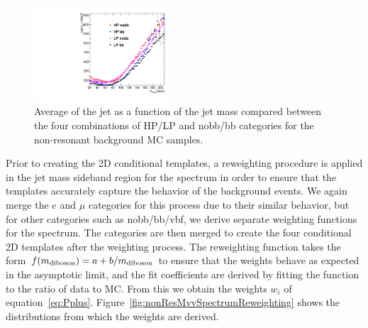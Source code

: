 \begin{figure}[htbp]
  \centering
  \includegraphics[width=0.45\textwidth]{fig/analysis/nonRes_corr.pdf}
  \caption{
    Average \pt of the jet as a function of the jet mass \MJ compared between the four combinations of HP/LP and nobb/bb categories for the non-resonant background MC samples.
  }
  \label{fig:nonRes2DCorr}
\end{figure}

Prior to creating the 2D conditional templates, a reweighting procedure is applied in the jet mass sideband region for the \MVV spectrum in order to ensure that the templates accurately capture the behavior of the background events.
We again merge the $e$ and $\mu$ categories for this process due to their similar behavior, but for other categories such as nobb/bb/vbf, we derive separate weighting functions for the \MVV spectrum.
The categories are then merged to create the four conditional 2D templates after the weighting process.
The reweighting function takes the form $f(m_\mathrm{diboson})=a+b/m_\mathrm{diboson}$ to ensure that the weights behave as expected in the asymptotic limit, and the fit coefficients are derived by fitting the function to the ratio of data to MC.
From this we obtain the weights $w_i$ of equation~\ref{eq:Pplus}.
Figure~\ref{fig:nonResMvvSpectrumReweighting} shows the \MVV distributions from which the weights are derived.


